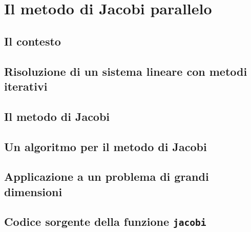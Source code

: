 \documentclass[
	a4paper,
	twoside,
	12pt
]{book}
\begin{document}
\chapter{Il metodo di Jacobi parallelo}
\label{cap3}

\section{Il contesto}

\section{Risoluzione di un sistema lineare con metodi iterativi}

\section{Il metodo di Jacobi}
\label{par:metodoJacobi}

\section{Un algoritmo per il metodo di Jacobi}
\label{par:algoritmoJacobi}

\section{Applicazione a un problema di grandi dimensioni}

\begin{appendix}
\chapter[Codice sorgente della funzione jacobi]{Codice sorgente della funzione \lstinline{jacobi}}
\label{app:jacobi}

\end{appendix}
\backmatter
\printbibliography[heading=bibintoc, title={Bibliografia}]
\end{document}
